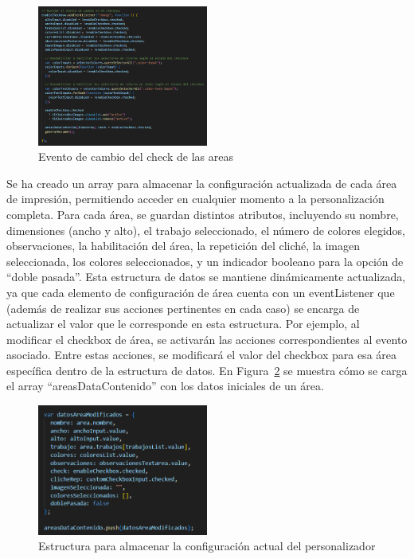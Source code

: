 \documentclass[11pt]{article}
\begin{document}
\begin{figure}[H]
    \centering
    \includegraphics[width=0.5\textwidth]{imagenesUS3-modal/manejoDesabilitarElementos.png}
    \caption{\label{fig:deshabilitarElementos} Evento de cambio del check de las areas}
    \vspace{\fill}
\end{figure}

Se ha creado un array para almacenar la configuración actualizada de cada área de impresión, permitiendo acceder en cualquier momento a la personalización completa.
Para cada área, se guardan distintos atributos, incluyendo su nombre, dimensiones (ancho y alto), el trabajo seleccionado, 
el número de colores elegidos, observaciones, la habilitación del área, la repetición del cliché, la imagen seleccionada, 
los colores seleccionados, y un indicador booleano para la opción de ``doble pasada''. Esta estructura de datos se mantiene dinámicamente actualizada,
ya que cada elemento de configuración de área cuenta con un eventListener que (además de realizar sus acciones pertinentes en cada caso) se encarga de actualizar el 
valor que le corresponde en esta estructura. Por ejemplo, al modificar el checkbox de área, se activarán las acciones correspondientes 
al evento asociado. Entre estas acciones, se modificará el valor del checkbox para esa área específica dentro de la estructura de datos.
En Figura~\ref{fig:variableConfiguracion} se muestra cómo se carga el array ``areasDataContenido'' con los datos iniciales de un área.

\begin{figure}[H]
    \centering
    \includegraphics[width=0.5\textwidth]{imagenesUS3-modal/variableDatosArreglada.png}
    \caption{\label{fig:variableConfiguracion} Estructura para almacenar la configuración actual del personalizador}
    \vspace{\fill}
\end{figure}
\end{document}
